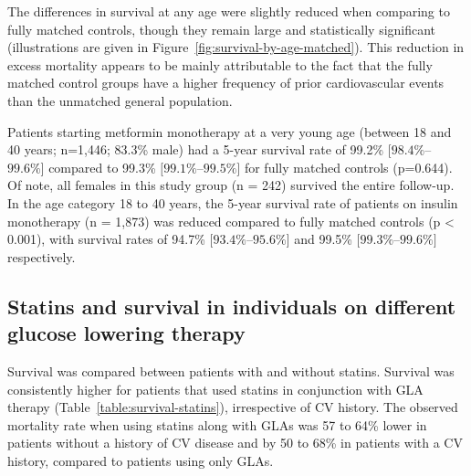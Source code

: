 
The differences in survival at any age were slightly reduced when comparing to fully matched controls, though they remain large and statistically significant (illustrations are given in Figure~\ref{fig:survival-by-age-matched}). This reduction in excess mortality appears to be mainly attributable to the fact that the fully matched control groups have a higher frequency of prior cardiovascular events than the unmatched general population. 

Patients starting metformin monotherapy at a very young age (between 18 and 40 years; n=1,446; 83.3\% male) had a 5-year survival rate of 99.2\% $[98.4\%$--$99.6\%]$ compared to 99.3\% $[99.1\%$--$99.5\%]$ for fully matched controls (p=0.644). Of note, all females in this study group (n = 242) survived the entire follow-up. In the age category 18 to 40 years, the 5-year survival rate of patients on insulin monotherapy (n = 1,873) was reduced compared to fully matched controls (p < 0.001), with survival rates of 94.7\% $[93.4\%$--$95.6\%]$ and 99.5\% $[99.3\%$--$99.6\%]$ respectively. 

\subsection{Statins and survival in individuals on different glucose lowering therapy}
Survival was compared between patients with and without statins. Survival was consistently higher for patients that used statins in conjunction with GLA therapy (Table~\ref{table:survival-statins}), irrespective of CV history. The observed mortality rate when using statins along with GLAs was 57 to 64\% lower in patients without a history of CV disease and by 50 to 68\% in patients with a CV history, compared to patients using only GLAs.


